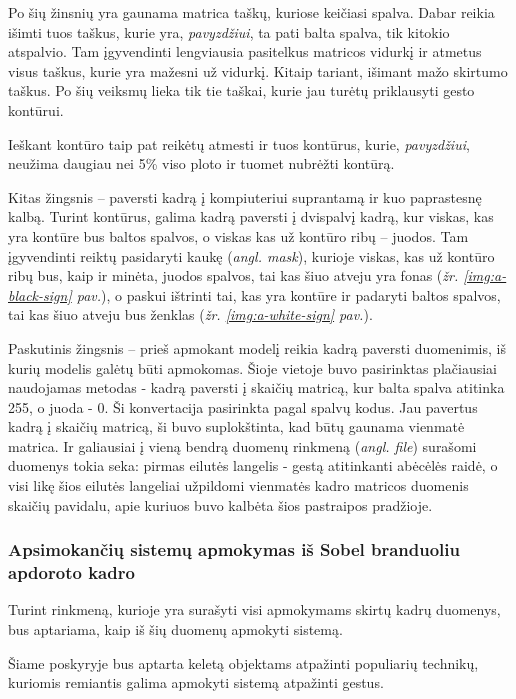 \documentclass{VUMIFInfKursinis}
\begin{document}
Po šių žinsnių yra gaunama matrica taškų, kuriose keičiasi spalva. Dabar reikia išimti tuos taškus, kurie yra, \textit{pavyzdžiui}, ta pati balta spalva, tik kitokio atspalvio. Tam įgyvendinti lengviausia pasitelkus matricos vidurkį ir atmetus visus taškus, kurie yra mažesni už vidurkį. Kitaip tariant, išimant mažo skirtumo taškus. Po šių veiksmų lieka tik tie taškai, kurie jau turėtų priklausyti gesto kontūrui.

Ieškant kontūro taip pat reikėtų atmesti ir tuos kontūrus, kurie, \textit{pavyzdžiui}, neužima daugiau nei 5\% viso ploto ir tuomet nubrėžti kontūrą.

Kitas žingsnis – paversti kadrą į kompiuteriui suprantamą ir kuo paprastesnę kalbą. Turint kontūrus, galima kadrą paversti į dvispalvį kadrą, kur viskas, kas yra kontūre bus baltos spalvos, o viskas kas už kontūro ribų – juodos. Tam įgyvendinti reiktų pasidaryti kaukę (\textit{angl. mask}), kurioje viskas, kas už kontūro ribų bus, kaip ir minėta, juodos spalvos, tai kas šiuo atveju yra fonas (\textit{žr. \ref{img:a-black-sign} pav.}), o paskui ištrinti tai, kas yra kontūre ir padaryti baltos spalvos, tai kas šiuo atveju bus ženklas (\textit{žr. \ref{img:a-white-sign} pav.}).

Paskutinis žingsnis – prieš apmokant modelį reikia kadrą paversti duomenimis, iš kurių modelis galėtų būti apmokomas. Šioje vietoje buvo pasirinktas plačiausiai naudojamas metodas - kadrą paversti į skaičių matricą, kur balta spalva atitinka 255, o juoda - 0. Ši konvertacija pasirinkta pagal spalvų kodus. Jau pavertus kadrą į skaičių matricą, ši buvo suplokštinta, kad būtų gaunama vienmatė matrica. Ir galiausiai į vieną bendrą duomenų rinkmeną (\textit{angl. file}) surašomi duomenys tokia seka: pirmas eilutės langelis - gestą atitinkanti abėcėlės raidė, o visi likę šios eilutės langeliai užpildomi vienmatės kadro matricos duomenis skaičių pavidalu, apie kuriuos buvo kalbėta šios pastraipos pradžioje.

\subsubsection{Apsimokančių sistemų apmokymas iš Sobel branduoliu apdoroto kadro}
Turint rinkmeną, kurioje yra surašyti visi apmokymams skirtų kadrų duomenys, bus aptariama, kaip iš šių duomenų apmokyti sistemą.

Šiame poskyryje bus aptarta keletą objektams atpažinti populiarių technikų, kuriomis remiantis galima apmokyti sistemą atpažinti gestus.
\end{document}

